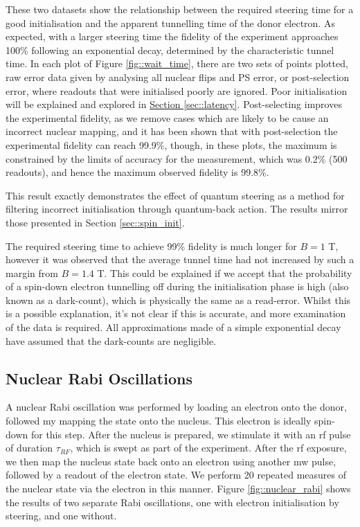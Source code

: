 	These two datasets show the relationship between the required steering time for a good initialisation and the apparent tunnelling time of the donor electron. As expected, with a larger steering time the fidelity of the experiment approaches 100\% following an exponential decay, determined by the characteristic tunnel time. In each plot of Figure \ref{fig::wait_time}, there are two sets of points plotted, raw error data given by analysing all nuclear flips and PS error, or post-selection error, where readouts that were initialised poorly are ignored. Poor initialisation will be explained and explored in \hyperref[sec::latency]{Section \ref{sec::latency}}. Post-selecting improves the experimental fidelity, as we remove cases which are likely to be cause an incorrect nuclear mapping, and it has been shown that with post-selection the experimental fidelity can reach 99.9\%, though, in these plots, the maximum is constrained by the limits of accuracy for the measurement, which was 0.2\% (500 readouts), and hence the maximum observed fidelity is 99.8\%. %

	This result exactly demonstrates the effect of quantum steering as a method for filtering incorrect initialisation through quantum-back action. The results mirror those presented in Section \ref{sec::spin_init}.
	
	The required steering time to achieve 99\% fidelity is much longer for $B = 1$ T, however it was observed that the average tunnel time had not increased by such a margin from $B = 1.4$ T. This could be explained if we accept that the probability of a spin-down electron tunnelling off during the initialisation phase is high (also known as a dark-count), which is physically the same as a read-error. Whilst this is a possible explanation, it's not clear if this is accurate, and more examination of the data is required. All approximations made of a simple exponential decay have assumed that the dark-counts are negligible.

\subsection{Nuclear Rabi Oscillations}
	A nuclear Rabi oscillation was performed by loading an electron onto the donor, followed my mapping the state onto the nucleus. This electron is ideally spin-down for this step. After the nucleus is prepared, we stimulate it with an \gls{rf} pulse of duration $\tau_{RF}$, which is swept as part of the experiment. After the \gls{rf} exposure, we then map the nucleus state back onto an electron using another \gls{mw} pulse, followed by a readout of the electron state. We perform 20 repeated measures of the nuclear state via the electron in this manner. 	Figure \ref{fig::nuclear_rabi} shows the results of two separate Rabi oscillations, one with electron initialisation by steering, and one without.
	
